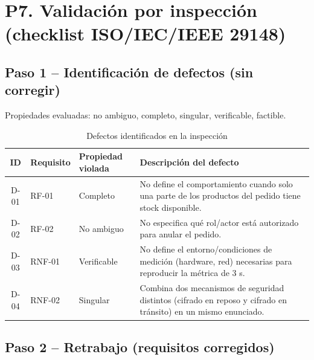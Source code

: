 \documentclass[12pt,a4paper]{article}
\begin{document}
    \section{P7. Validación por inspección (checklist ISO/IEC/IEEE 29148)}
    
    \subsection*{Paso 1 -- Identificación de defectos (sin corregir)}
    
    Propiedades evaluadas: no ambiguo, completo, singular, verificable, factible.
    
    \begin{table}[H]
    \centering
    \small
    \begin{tabular}{@{}clp{3.5cm}p{6.5cm}@{}}
    \toprule
    \textbf{ID} & \textbf{Requisito} & \textbf{Propiedad violada} & \textbf{Descripción del defecto} \\
    \midrule
    D-01 & RF-01 & Completo & No define el comportamiento cuando solo una parte de los productos del pedido tiene stock disponible. \\
    D-02 & RF-02 & No ambiguo & No especifica qué rol/actor está autorizado para anular el pedido. \\
    D-03 & RNF-01 & Verificable & No define el entorno/condiciones de medición (hardware, red) necesarias para reproducir la métrica de 3 s. \\
    D-04 & RNF-02 & Singular & Combina dos mecanismos de seguridad distintos (cifrado en reposo y cifrado en tránsito) en un mismo enunciado. \\
    \bottomrule
    \end{tabular}
    \caption{Defectos identificados en la inspección}
    \end{table}
    
    \subsection*{Paso 2 -- Retrabajo (requisitos corregidos)}
    
\end{document}
